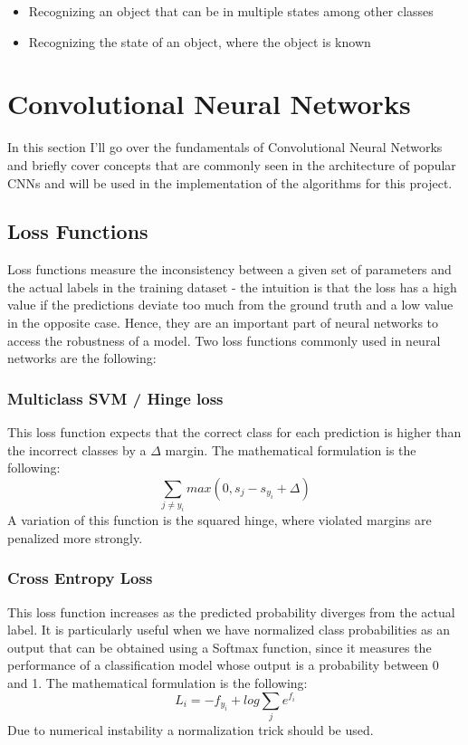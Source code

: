 \documentclass[10pt,a4paper]{article}
\begin{document}
\begin{itemize}
\item Recognizing an object that can be in multiple states among other classes
\item Recognizing the state of an object, where the object is known
\end{itemize}

\section{Convolutional Neural Networks}
In this section I'll go over the fundamentals of Convolutional Neural Networks and briefly cover concepts that are commonly seen in the architecture of popular CNNs and will be used in the implementation of the algorithms for this project.

\subsection{Loss Functions}
Loss functions measure the inconsistency between a given set of parameters and the actual labels in the training dataset - the intuition is that the loss has a high value if the predictions deviate too much from the ground truth and a low value in the opposite case. Hence, they are an important part of neural networks to access the robustness of a model.  Two loss functions commonly used in neural networks are the following:

\subsubsection{Multiclass SVM / Hinge loss}
This loss function expects that the correct class for each prediction is higher than the incorrect classes by a $\Delta$ margin. The mathematical formulation is the following: $$\sum_{j \neq y_i} max (0, s_j - s_{y_i} + \Delta)$$ A variation of this function is the squared hinge, where violated margins are penalized more strongly. 

\subsubsection{Cross Entropy Loss}
This loss function increases as the predicted probability diverges from the actual label. It is particularly useful when we have normalized class probabilities as an output that can be obtained using a Softmax function, since it measures the performance of a classification model whose output is a probability between 0 and 1. The mathematical formulation is the following: $$L_i = -f_{y_i} + log \sum_{j} e^{f_i}$$ Due to numerical instability a normalization trick should be used.
\end{document}
